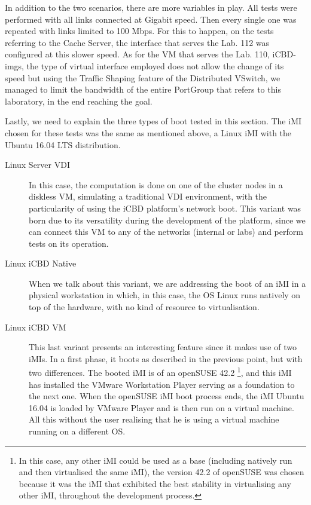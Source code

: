 In addition to the two scenarios, there are more variables in play. All tests were performed with all links connected at Gigabit speed. Then every single one was repeated with links limited to 100 Mbps. For this to happen, on the tests referring to the Cache Server, the interface that serves the Lab. 112 was configured at this slower speed. As for the VM that serves the Lab. 110, iCBD-imgs, the type of virtual interface employed does not allow the change of its speed but using the Traffic Shaping feature of the Distributed VSwitch, we managed to limit the bandwidth of the entire PortGroup that refers to this laboratory, in the end reaching the goal.

Lastly, we need to explain the three types of boot tested in this section. The iMI chosen for these tests was the same as mentioned above, a Linux iMI with the Ubuntu 16.04 LTS distribution.

\begin{description}
	\item [Linux Server VDI] In this case, the computation is done on one of the cluster nodes in a diskless VM, simulating a traditional VDI environment, with the particularity of using the iCBD platform's network boot. This variant was born due to its versatility during the development of the platform, since we can connect this VM to any of the networks (internal or labs) and perform tests on its operation.
	\item [Linux iCBD Native] When we talk about this variant, we are addressing the boot of an iMI in a physical workstation in which, in this case, the OS Linux runs natively on top of the hardware, with no kind of resource to virtualisation.
	\item [Linux iCBD VM] This last variant presents an interesting feature since it makes use of two iMIs. In a first phase, it boots as described in the previous point, but with two differences. The booted iMI is of an openSUSE 42.2 \footnote{In this case, any other iMI could be used as a base (including natively run and then virtualised the same iMI), the version  42.2 of openSUSE was chosen because it was the iMI that exhibited the best stability in virtualising any other iMI, throughout the development process.}, and this iMI has installed the VMware Workstation Player serving as a foundation to the next one. When the openSUSE iMI boot process ends, the iMI Ubuntu 16.04 is loaded by VMware Player and is then run on a virtual machine. All this without the user realising that he is using a virtual machine running on a different OS.
\end{description}

